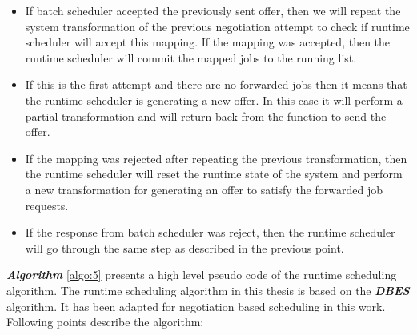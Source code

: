 \begin{itemize}
\item If batch scheduler accepted the previously sent offer, then we will repeat the system transformation of the previous negotiation attempt to check if runtime scheduler will accept this mapping. If the mapping was accepted, then the runtime scheduler will commit the mapped jobs to the running list. 
\item If this is the first attempt and there are no forwarded jobs then it means that the runtime scheduler is generating a new offer. In this case it will perform a partial transformation and will return back from the function to send the offer.
\item If the mapping was rejected after repeating the previous transformation, then the runtime scheduler will reset the runtime state of the system and perform a new transformation for generating an offer to satisfy the forwarded job requests.
\item If the response from batch scheduler was reject, then the runtime scheduler will go through the same step as described in the previous point.
\end{itemize}
\textbf{\textit{Algorithm }}\ref{algo:5} presents a high level pseudo code of the runtime scheduling algorithm. The runtime scheduling algorithm in this thesis is based on the \textbf{\textit{DBES}} algorithm\cite{laxmikant}. It has been adapted for negotiation based scheduling in this work. Following points describe the algorithm:
